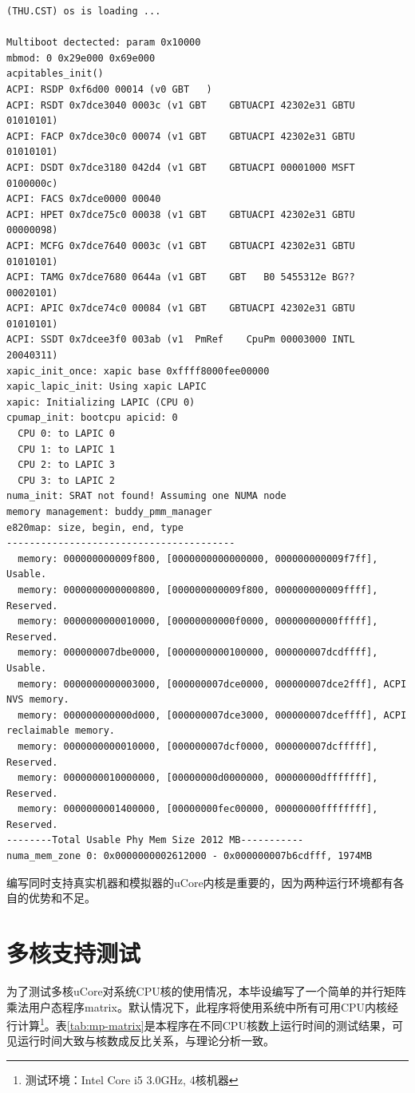 {\tiny
	\begin{Verbatim}[frame=single]
(THU.CST) os is loading ...

Multiboot dectected: param 0x10000
mbmod: 0 0x29e000 0x69e000
acpitables_init()
ACPI: RSDP 0xf6d00 00014 (v0 GBT   )
ACPI: RSDT 0x7dce3040 0003c (v1 GBT    GBTUACPI 42302e31 GBTU 01010101)
ACPI: FACP 0x7dce30c0 00074 (v1 GBT    GBTUACPI 42302e31 GBTU 01010101)
ACPI: DSDT 0x7dce3180 042d4 (v1 GBT    GBTUACPI 00001000 MSFT 0100000c)
ACPI: FACS 0x7dce0000 00040
ACPI: HPET 0x7dce75c0 00038 (v1 GBT    GBTUACPI 42302e31 GBTU 00000098)
ACPI: MCFG 0x7dce7640 0003c (v1 GBT    GBTUACPI 42302e31 GBTU 01010101)
ACPI: TAMG 0x7dce7680 0644a (v1 GBT    GBT   B0 5455312e BG?? 00020101)
ACPI: APIC 0x7dce74c0 00084 (v1 GBT    GBTUACPI 42302e31 GBTU 01010101)
ACPI: SSDT 0x7dcee3f0 003ab (v1  PmRef    CpuPm 00003000 INTL 20040311)
xapic_init_once: xapic base 0xffff8000fee00000
xapic_lapic_init: Using xapic LAPIC
xapic: Initializing LAPIC (CPU 0)
cpumap_init: bootcpu apicid: 0
  CPU 0: to LAPIC 0
  CPU 1: to LAPIC 1
  CPU 2: to LAPIC 3
  CPU 3: to LAPIC 2
numa_init: SRAT not found! Assuming one NUMA node
memory management: buddy_pmm_manager
e820map: size, begin, end, type
----------------------------------------
  memory: 000000000009f800, [0000000000000000, 000000000009f7ff], Usable.
  memory: 0000000000000800, [000000000009f800, 000000000009ffff], Reserved.
  memory: 0000000000010000, [00000000000f0000, 00000000000fffff], Reserved.
  memory: 000000007dbe0000, [0000000000100000, 000000007dcdffff], Usable.
  memory: 0000000000003000, [000000007dce0000, 000000007dce2fff], ACPI NVS memory.
  memory: 000000000000d000, [000000007dce3000, 000000007dceffff], ACPI reclaimable memory.
  memory: 0000000000010000, [000000007dcf0000, 000000007dcfffff], Reserved.
  memory: 0000000010000000, [00000000d0000000, 00000000dfffffff], Reserved.
  memory: 0000000001400000, [00000000fec00000, 00000000ffffffff], Reserved.
--------Total Usable Phy Mem Size 2012 MB-----------
numa_mem_zone 0: 0x0000000002612000 - 0x000000007b6cdfff, 1974MB
	\end{Verbatim}
}

编写同时支持真实机器和模拟器的uCore内核是重要的，因为两种运行环境都有各自的优势和不足。

\section{多核支持测试}
为了测试多核uCore对系统CPU核的使用情况，本毕设编写了一个简单的并行矩阵乘法用户态程序matrix。默认情况下，此程序将使用系统中所有可用CPU内核经行计算\footnote{测试环境：Intel Core
i5 3.0GHz, 4核机器}。表\ref{tab:mp-matrix}是本程序在不同CPU核数上运行时间的测试结果，可见运行时间大致与核数成反比关系，与理论分析一致。

